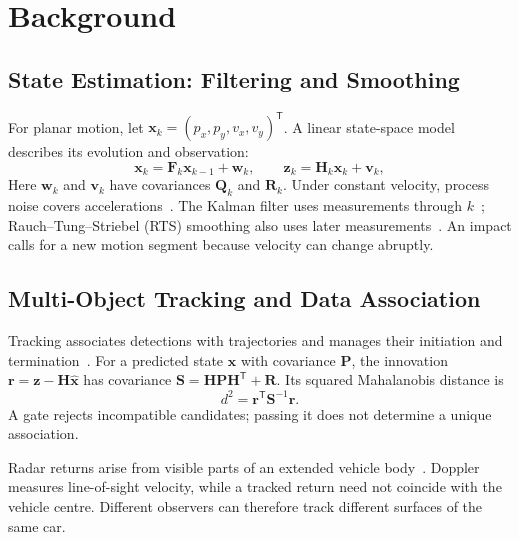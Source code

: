 \section{Background}
\label{sec:background}

\subsection{State Estimation: Filtering and Smoothing}
\label{subsec:state-estimation}

For planar motion, let
$\mathbf{x}_k=(p_x,p_y,v_x,v_y)^{\mathsf T}$. A linear state-space model
describes its evolution and observation:
\begin{equation}
  \mathbf{x}_k=\mathbf{F}_k\mathbf{x}_{k-1}+\mathbf{w}_k,
  \qquad
  \mathbf{z}_k=\mathbf{H}_k\mathbf{x}_k+\mathbf{v}_k,
  \label{eq:state-space}
\end{equation}
Here $\mathbf{w}_k$ and $\mathbf{v}_k$ have covariances $\mathbf{Q}_k$
and $\mathbf{R}_k$. Under constant velocity, process noise covers
accelerations~\cite{barshalom2001estimation}. The Kalman filter uses
measurements through $k$~\cite{kalman1960filtering}; Rauch--Tung--Striebel
(RTS) smoothing also uses later measurements~\cite{rauch1965smoothing}.
An impact calls for a new motion segment because velocity can change
abruptly.

\subsection{Multi-Object Tracking and Data Association}
\label{subsec:multi-object-tracking}

Tracking associates detections with trajectories and manages their
initiation and termination~\cite{barshalom2001estimation}. For a
predicted state $\hat{\mathbf{x}}$ with covariance $\mathbf{P}$, the
innovation $\mathbf{r}=\mathbf{z}-\mathbf{H}\hat{\mathbf{x}}$ has covariance
$\mathbf{S}=\mathbf{H}\mathbf{P}\mathbf{H}^{\mathsf T}+\mathbf{R}$.
Its squared Mahalanobis distance is
\begin{equation}
  d^2=\mathbf{r}^{\mathsf T}\mathbf{S}^{-1}\mathbf{r}.
  \label{eq:association-distance}
\end{equation}
A gate rejects incompatible candidates; passing it does not determine
a unique association.

Radar returns arise from visible parts of an extended vehicle
body~\cite{hammarstrand2012extended,granstrom2017extended}. Doppler
measures line-of-sight velocity, while a tracked return need not
coincide with the vehicle centre. Different observers can therefore
track different surfaces of the same car.


